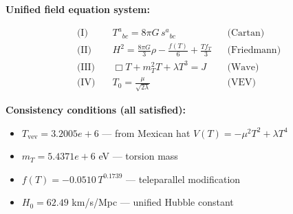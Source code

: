 
\textbf{Unified field equation system:}

\begin{align}
  \text{(I)} \quad & T^a{}_{bc} = 8\pi G \, s^a{}_{bc} && \text{(Cartan)} \\
  \text{(II)} \quad & H^2 = \frac{8\pi G}{3}\rho - \frac{f(T)}{6} + \frac{Tf_T}{3} && \text{(Friedmann)} \\
  \text{(III)} \quad & \Box T + m_T^2 T + \lambda T^3 = J && \text{(Wave)} \\
  \text{(IV)} \quad & T_0 = \frac{\mu}{\sqrt{2\lambda}} && \text{(VEV)}
\end{align}

\textbf{Consistency conditions (all satisfied):}
\begin{itemize}
  \item $T_{\text{vev}} = 3.2005e+6$ — from Mexican hat $V(T) = -\mu^2 T^2 + \lambda T^4$
  \item $m_T = 5.4371e+6$ eV — torsion mass
  \item $f(T) = -0.0510 \, T^{0.1739}$ — teleparallel modification
  \item $H_0 = 62.49$ km/s/Mpc — unified Hubble constant
\end{itemize}